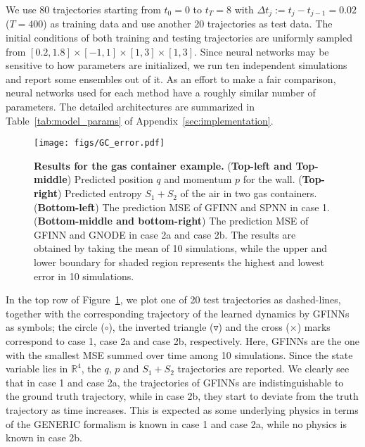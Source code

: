 \documentclass[openacc]{rsproca_new}%
\newcommand{\z}{\bm{z}}
\begin{document}
We use 80 trajectories starting from 
$t_0 = 0$ to $t_T = 8$ with $\Delta t_j := t_j - t_{j-1} = 0.02$ ($T=400$) as training data
and use another 20 trajectories as test data. 
The initial conditions of both training and testing trajectories are uniformly sampled from $[0.2,1.8]\times[-1,1]\times[1,3]\times[1,3]$.
Since neural networks may be 
sensitive to how parameters are initialized,
we run ten independent simulations 
and report some ensembles out of it.
As an effort to make a fair comparison,
neural networks used for each method
have a roughly similar number of parameters.
The detailed architectures are summarized in
Table~\ref{tab:model_params}
of Appendix~\ref{sec:implementation}.
\begin{figure}[ht]
    \centering
    \texttt{[image: figs/GC\_error.pdf]}
    \caption{\textbf{Results for the gas container example.} (\textbf{Top-left and Top-middle}) Predicted position $q$ and momentum $p$ for the wall. (\textbf{Top-right}) Predicted entropy $S_1 + S_2$ of the air in two gas containers. (\textbf{Bottom-left}) The prediction MSE of GFINN and SPNN in case 1. (\textbf{Bottom-middle and bottom-right}) The prediction MSE of GFINN and GNODE in case 2a and case 2b. The results are obtained by taking the mean of 10 simulations, while the upper and lower boundary for shaded region represents the highest and lowest error in 10 simulations.
    }
    \label{fig:gc_error}
\end{figure}

In the top row of Figure~\ref{fig:gc_error}, 
we plot 
one of 20 test trajectories
as dashed-lines,
together with 
the corresponding trajectory of 
the learned dynamics by GFINNs 
as symbols;
the circle ($\circ$), 
the inverted triangle ($\triangledown$)
and the cross ($\times$) marks 
correspond to 
case 1, case 2a and case 2b, respectively. 
Here, GFINNs are the one with the smallest 
MSE summed over time among 10 simulations.
Since the state variable lies in $\mathbb{R}^4$,
the $q$, $p$ and $S_1+S_2$ trajectories are reported.
We clearly see that 
in case 1 and case 2a,
the trajectories of GFINNs
are indistinguishable to 
the ground truth trajectory,
while in case 2b, 
they start to deviate from the truth trajectory
as time increases.
This is expected 
as some underlying physics in terms of 
the GENERIC formalism is known in case 1 and case 2a, while no physics is known in case 2b.
\end{document}
